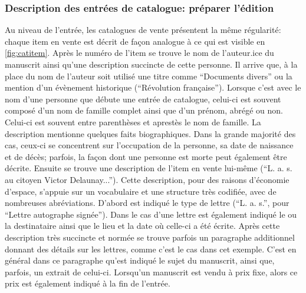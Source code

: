 \subsubsection{Description des entrées de catalogue: préparer l'édition \tei{}}

Au niveau de l'entrée, les catalogues de vente présentent la même régularité: chaque item en vente est décrit de façon analogue à ce qui est visible en \ref{fig:catitem}. Après le numéro de l'item se trouve le nom de l'auteur.ice du manuscrit ainsi qu'une description succincte de cette personne. Il arrive que, à la place du nom de l'auteur soit utilisé une titre comme \enquote{Documents divers} ou la mention d'un évènement historique (\enquote{Révolution française}). Lorsque c'est avec le nom d'une personne que débute une entrée de catalogue, celui-ci est souvent composé d'un nom de famille complet ainsi que d'un prénom, abrégé ou non. Celui-ci est souvent entre parenthèses et aprestès le nom de famille. La description mentionne quelques faits biographiques. Dans la grande majorité des cas, ceux-ci se concentrent sur l'occupation de la personne, sa date de naissance et de décès; parfois, la façon dont une personne est morte peut également être décrite. Ensuite se trouve une description de l'item en vente lui-même (\enquote{L. a. s. au citoyen Victor Delaunay...}). Cette description, pour des raisons d'économie d'espace, s'appuie sur un vocabulaire et une structure très codifiée, avec de nombreuses abréviations. D'abord est indiqué le type de lettre (\enquote{L. a. s.}, pour \enquote{Lettre autographe signée}). Dans le cas d'une lettre est également indiqué le ou la destinataire ainsi que le lieu et la date où celle-ci a été écrite. Après cette description très succincte et normée se trouve parfois un paragraphe additionnel donnant des détails sur les lettres, comme c'est le cas dans cet exemple. C'est en général dans ce paragraphe qu'est indiqué le sujet du manuscrit, ainsi que, parfois, un extrait de celui-ci. Lorsqu'un manuscrit est vendu à prix fixe, alors ce prix est également indiqué à la fin de l'entrée.

